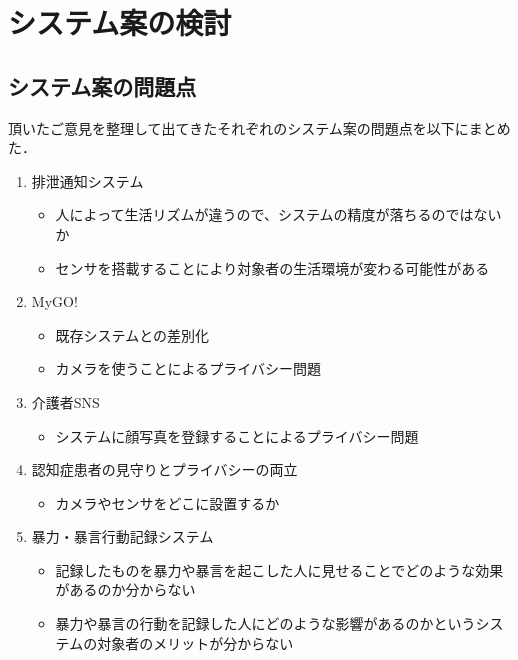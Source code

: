 \documentclass[../report]{subfiles}
\begin{document}
\section{システム案の検討}
\subsection{システム案の問題点}
頂いたご意見を整理して出てきたそれぞれのシステム案の問題点を以下にまとめた．

\begin{enumerate}
    \item[] 排泄通知システム
\begin{itemize}
    \item 人によって生活リズムが違うので、システムの精度が落ちるのではないか
    \item センサを搭載することにより対象者の生活環境が変わる可能性がある
\end{itemize}

    \item[] MyGO!
\begin{itemize}
    \item 既存システムとの差別化
    \item カメラを使うことによるプライバシー問題
\end{itemize}

    \item[] 介護者SNS
\begin{itemize}
    \item システムに顔写真を登録することによるプライバシー問題
\end{itemize}

    \item[] 認知症患者の見守りとプライバシーの両立
\begin{itemize}
    \item カメラやセンサをどこに設置するか
\end{itemize}

    \item[] 暴力・暴言行動記録システム
\begin{itemize}
    \item 記録したものを暴力や暴言を起こした人に見せることでどのような効果があるのか分からない
    \item 暴力や暴言の行動を記録した人にどのような影響があるのかというシステムの対象者のメリットが分からない
\end{itemize}
\end{enumerate}
\end{document}

